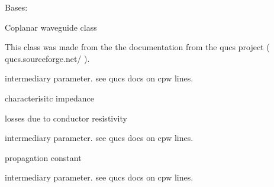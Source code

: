 \documentclass[letterpaper,10pt,english]{sphinxmanual}
\begin{document}
\begin{fulllineitems}
\label{api/mwavepy.media:mwavepy.media.cpw.CPW}
Bases: {\hyperref[api/mwavepy.media:mwavepy.media.media.Media]{}}

Coplanar waveguide class

This class was made from the the documentation from the
qucs project ( qucs.sourceforge.net/ ).

\begin{fulllineitems}
\label{api/mwavepy.media:mwavepy.media.cpw.CPW.K_ratio}
intermediary parameter. see qucs docs on cpw lines.

\end{fulllineitems}


\begin{fulllineitems}
\label{api/mwavepy.media:mwavepy.media.cpw.CPW.Z0}
characterisitc impedance

\end{fulllineitems}


\begin{fulllineitems}
\label{api/mwavepy.media:mwavepy.media.cpw.CPW.alpha_conductor}
losses due to conductor resistivity

\end{fulllineitems}


\begin{fulllineitems}
\label{api/mwavepy.media:mwavepy.media.cpw.CPW.ep_re}
intermediary parameter. see qucs docs on cpw lines.

\end{fulllineitems}


\begin{fulllineitems}
\label{api/mwavepy.media:mwavepy.media.cpw.CPW.gamma}
propagation constant

\end{fulllineitems}


\begin{fulllineitems}
\label{api/mwavepy.media:mwavepy.media.cpw.CPW.k1}
intermediary parameter. see qucs docs on cpw lines.

\end{fulllineitems}


\end{fulllineitems}
\end{document}

